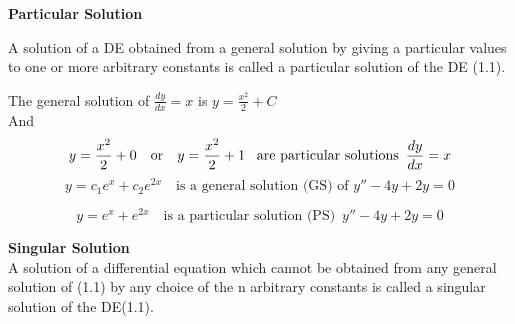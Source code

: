 \documentclass[a4aper,12pt]{report}
\begin{document}
\noindent\textbf{Particular Solution} 
\begin{center}
\end{center}
A solution of a DE obtained from a general solution by giving a particular values to one or more arbitrary constants is called a particular solution of the DE (1.1).
\vspace{5pt}
\begin{tcolorbox}[breakable, title = {\textbf{Example 1.4:}}]
   The general solution of \( \frac{dy}{dx} = x \) is 
$
y = \frac{x^2}{2} + C
$
\\ And 
\[
y = \frac{x^2}{2} + 0 \quad \text{or} \quad y = \frac{x^2}{2} + 1 \text{\,\,\,  
are particular solutions} \,\,\, \dfrac{dy}{dx}=x
\]
\[
y = c_1 e^x + c_2 e^{2x} \quad \text{is a general solution (GS) of } y'' - 4y + 2y = 0
\]

\[
y = e^x + e^{2x} \quad \text{is a particular solution (PS)} \,\,\, y'' - 4y + 2y = 0
\]
\end{tcolorbox}

\vspace{1em}
\noindent \textbf{Singular Solution} \\ [5pt]
A solution of a differential equation which cannot be obtained from any general solution of (1.1) by any choice of the n arbitrary constants is called a singular solution of the DE(1.1).
\end{document}
